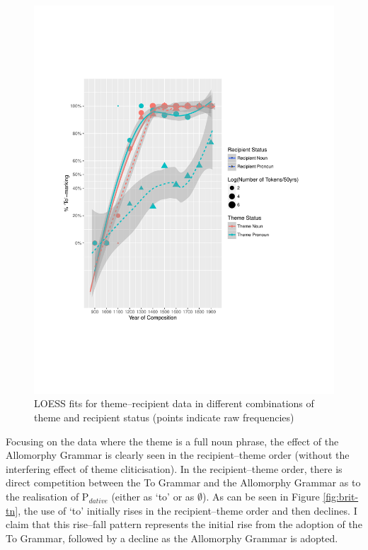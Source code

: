 	\begin{figure}[ht!]
		\includegraphics[width=\linewidth]{../images/brit-tr}
		\caption{LOESS fits for theme--recipient data in different combinations of theme and recipient status (points indicate raw frequencies)}
		\label{fig:brit-tr}
	\end{figure}

	Focusing on the data where the theme is a full noun phrase, the effect of the Allomorphy Grammar is clearly seen in the recipient--theme order (without the interfering effect of theme cliticisation). In the recipient--theme order, there is direct competition between the To Grammar and the Allomorphy Grammar as to the realisation of P$_{dative}$ (either as `to' or as $\emptyset$). As can be seen in Figure \ref{fig:brit-tn}, the use of `to' initially rises in the recipient--theme order and then declines. I claim that this rise--fall pattern represents the initial rise from the adoption of the To Grammar, followed by a decline as the Allomorphy Grammar is adopted.

